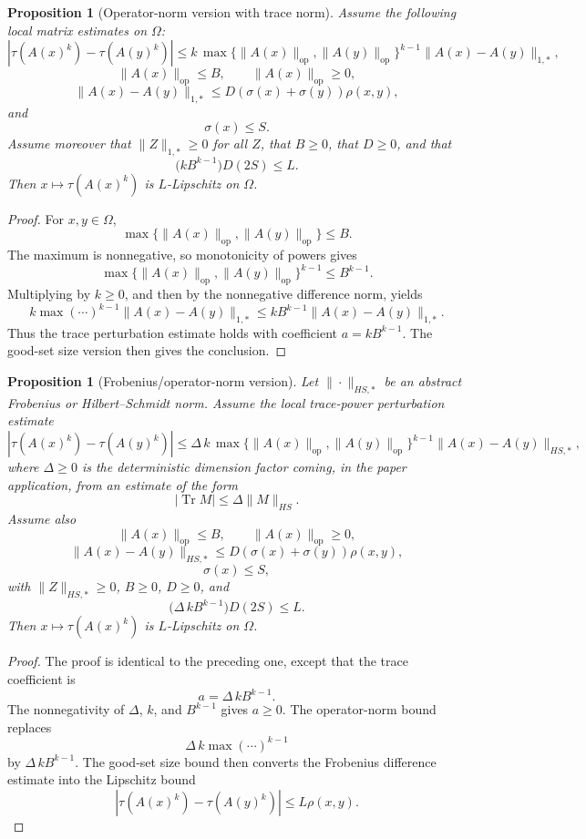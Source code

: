\documentclass[11pt]{article}
\newtheorem{proposition}[theorem]{Proposition}
\DeclareMathOperator{\Tr}{Tr}
\newcommand{\OmegaGood}{\Omega}
\begin{document}
\begin{proposition}[Operator-norm version with trace norm]
Assume the following local matrix estimates on \(\OmegaGood\):
\[
 |\tau(A(x)^k)-\tau(A(y)^k)|
 \le k\,
   \max\{\|A(x)\|_{\mathrm{op}},\|A(y)\|_{\mathrm{op}}\}^{k-1}
   \|A(x)-A(y)\|_{1,*},
\]
\[
 \|A(x)\|_{\mathrm{op}}\le B,\qquad
 \|A(x)\|_{\mathrm{op}}\ge0,
\]
\[
 \|A(x)-A(y)\|_{1,*}
    \le D(\sigma(x)+\sigma(y))\rho(x,y),
\]
and
\[
 \sigma(x)\le S.
\]
Assume moreover that \(\|Z\|_{1,*}\ge0\) for all \(Z\), that \(B\ge0\), that
\(D\ge0\), and that
\[
   \bigl(k B^{k-1}\bigr)D(2S)\le L.
\]
Then \(x\mapsto \tau(A(x)^k)\) is \(L\)-Lipschitz on \(\OmegaGood\).
\end{proposition}

\begin{proof}
For \(x,y\in\OmegaGood\),
\[
 \max\{\|A(x)\|_{\mathrm{op}},\|A(y)\|_{\mathrm{op}}\}\le B.
\]
The maximum is nonnegative, so monotonicity of powers gives
\[
 \max\{\|A(x)\|_{\mathrm{op}},\|A(y)\|_{\mathrm{op}}\}^{k-1}
 \le B^{k-1}.
\]
Multiplying by \(k\ge0\), and then by the nonnegative difference norm, yields
\[
 k\max(\cdots)^{k-1}\|A(x)-A(y)\|_{1,*}
 \le
 kB^{k-1}\|A(x)-A(y)\|_{1,*}.
\]
Thus the trace perturbation estimate holds with coefficient \(a=kB^{k-1}\).
The good-set size version then gives the conclusion.
\end{proof}

\begin{proposition}[Frobenius/operator-norm version]
Let \(\|\cdot\|_{HS,*}\) be an abstract Frobenius or Hilbert--Schmidt norm.
Assume the local trace-power perturbation estimate
\[
 |\tau(A(x)^k)-\tau(A(y)^k)|
 \le
 \Delta\, k\,
 \max\{\|A(x)\|_{\mathrm{op}},\|A(y)\|_{\mathrm{op}}\}^{k-1}
 \|A(x)-A(y)\|_{HS,*},
\]
where \(\Delta\ge0\) is the deterministic dimension factor coming, in the
paper application, from an estimate of the form
\[
  |\Tr M|\le \Delta \|M\|_{HS}.
\]
Assume also
\[
 \|A(x)\|_{\mathrm{op}}\le B,\qquad
 \|A(x)\|_{\mathrm{op}}\ge0,
\]
\[
 \|A(x)-A(y)\|_{HS,*}
    \le D(\sigma(x)+\sigma(y))\rho(x,y),
\]
\[
 \sigma(x)\le S,
\]
with \(\|Z\|_{HS,*}\ge0\), \(B\ge0\), \(D\ge0\), and
\[
  \bigl(\Delta\,kB^{k-1}\bigr)D(2S)\le L.
\]
Then \(x\mapsto \tau(A(x)^k)\) is \(L\)-Lipschitz on \(\OmegaGood\).
\end{proposition}

\begin{proof}
The proof is identical to the preceding one, except that the trace coefficient
is
\[
  a=\Delta\,kB^{k-1}.
\]
The nonnegativity of \(\Delta\), \(k\), and \(B^{k-1}\) gives \(a\ge0\).
The operator-norm bound replaces
\[
 \Delta\,k\max(\cdots)^{k-1}
\]
by \(\Delta\,kB^{k-1}\).  The good-set size bound then converts the
Frobenius difference estimate into the Lipschitz bound
\[
 |\tau(A(x)^k)-\tau(A(y)^k)|\le L\rho(x,y).
\]
\end{proof}
\end{document}
